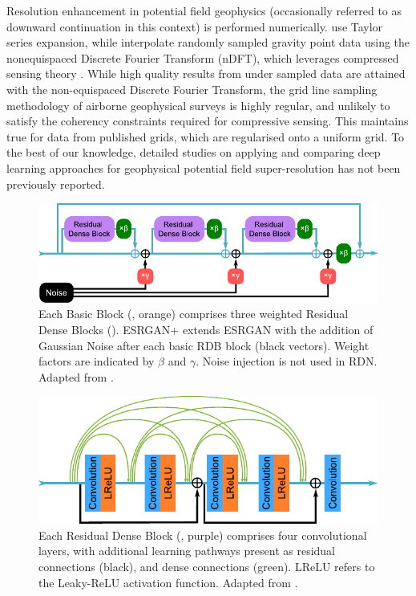 Resolution enhancement in potential field geophysics (occasionally referred to as downward continuation in this context) is performed numerically.
\Textcite{chenPotentialFieldData2022} use Taylor series expansion, while \textcite{xuGravityAnomalyReconstruction2019} interpolate randomly sampled gravity point data using the nonequispaced Discrete Fourier Transform (nDFT), which leverages compressed sensing theory \parencite{candesIntroductionCompressiveSampling2008}.
While high quality results from under sampled data are attained with the non-equispaced Discrete Fourier Transform, the grid line sampling methodology of airborne geophysical surveys is highly regular, and unlikely to satisfy the coherency constraints required for compressive sensing.
This maintains true for data from published grids, which are regularised onto a uniform grid.
To the best of our knowledge, detailed studies on applying and comparing deep learning approaches for geophysical potential field super-resolution has not been previously reported.

\begin{figure}[hbtp]
    \centering
    \includegraphics[width=\linewidth]{fig/p1/rdb_vec.pdf}
    \caption[Basic blocks]{Each Basic Block (, orange) comprises three weighted Residual Dense Blocks ().
        ESRGAN+ extends ESRGAN with the addition of Gaussian Noise after each basic RDB block (black vectors).
        Weight factors are indicated by \(\beta{}\) and \(\gamma{}\).
        Noise injection is not used in RDN\@.
        Adapted from \textcite{rakotonirinaESRGANFurtherImproving2020}.
    }
    \label{fig:rdb}
\end{figure}

\begin{figure}[hbtp]
    \centering
    \includegraphics[width=0.75\linewidth]{fig/p1/convs_vec.pdf}
    \caption[RDB convolutional layers]{Each Residual Dense Block (, purple) comprises four convolutional layers, with additional learning pathways present as residual connections (black), and dense connections (green). LReLU refers to the Leaky-ReLU activation function. Adapted from \textcite{rakotonirinaESRGANFurtherImproving2020}.}
    \label{fig:convs}
\end{figure}


